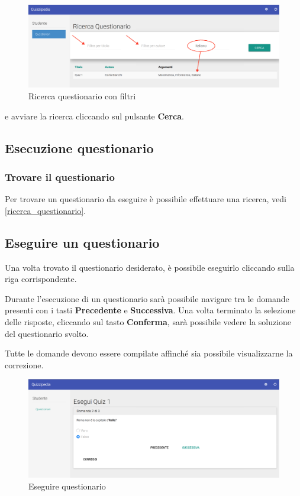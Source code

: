 \documentclass[12pt,a4paper]{article}
\begin{document}
	\begin{figure}[H]		
		\centering
		\includegraphics[width=1.0\linewidth]{../img/screenshot/filtriRicerca.png}
		\caption{Ricerca questionario con filtri}
		\label{Ricerca questionario con filtri}
	\end{figure}
	
	e avviare la ricerca cliccando sul pulsante \textbf{Cerca}.
	
	
	\subsection{Esecuzione questionario}
	\subsubsection{Trovare il questionario}
	Per trovare un questionario da eseguire è possibile effettuare una ricerca, vedi \ref{ricerca_questionario}.
	\subsection{Eseguire un questionario}
	\par Una volta trovato il questionario desiderato, è possibile eseguirlo cliccando sulla riga corrispondente. \\
	\par Durante l'esecuzione di un questionario sarà possibile navigare tra le domande presenti con i tasti \textbf{Precedente} e \textbf{Successiva}.
	Una volta terminato la selezione delle risposte, cliccando sul tasto \textbf{Conferma}, sarà possibile vedere la soluzione del questionario svolto. \\
	\par Tutte le domande devono essere compilate affinché sia possibile visualizzarne la correzione. \\
	
	\begin{figure}[H]	
		\centering
		\includegraphics[width=1.0\linewidth]{../img/screenshot/esecuzioneQuestionario.png}
		\caption{Eseguire questionario}
		\label{Eseguire questionario}
	\end{figure}
	
\end{document}
